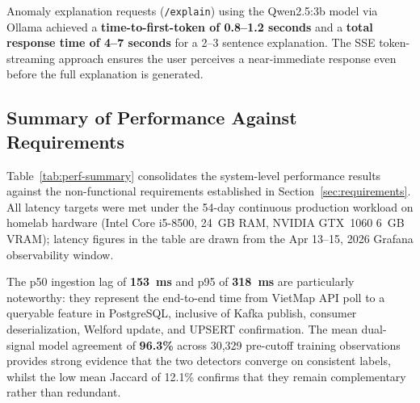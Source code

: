 Anomaly explanation requests (\texttt{/explain}) using the Qwen2.5:3b model
via Ollama achieved a \textbf{time-to-first-token of 0.8--1.2 seconds} and a
\textbf{total response time of 4--7 seconds} for a 2--3 sentence explanation.
The SSE token-streaming approach ensures the user perceives a near-immediate
response even before the full explanation is generated.

\subsection{Summary of Performance Against Requirements}

Table~\ref{tab:perf-summary} consolidates the system-level performance results
against the non-functional requirements established in
Section~\ref{sec:requirements}. All latency targets were met under the
54-day continuous production workload on homelab hardware (Intel Core i5-8500,
24~GB RAM, NVIDIA GTX~1060 6~GB VRAM); latency figures in the table are
drawn from the Apr 13--15, 2026 Grafana observability window.

\begin{table}[htbp]
\centering
\caption{Measured performance vs.\ non-functional requirements.}
\label{tab:perf-summary}
\end{table}

\noindent The p50 ingestion lag of \textbf{153~ms} and p95 of \textbf{318~ms} are
particularly noteworthy: they represent the end-to-end time from VietMap API
poll to a queryable feature in PostgreSQL, inclusive of Kafka publish,
consumer deserialization, Welford update, and UPSERT confirmation.
The mean dual-signal model agreement of
\textbf{96.3\%} across 30,329 pre-cutoff training observations provides
strong evidence that the two detectors converge on consistent labels, whilst
the low mean Jaccard of 12.1\% confirms that they remain complementary rather
than redundant.

